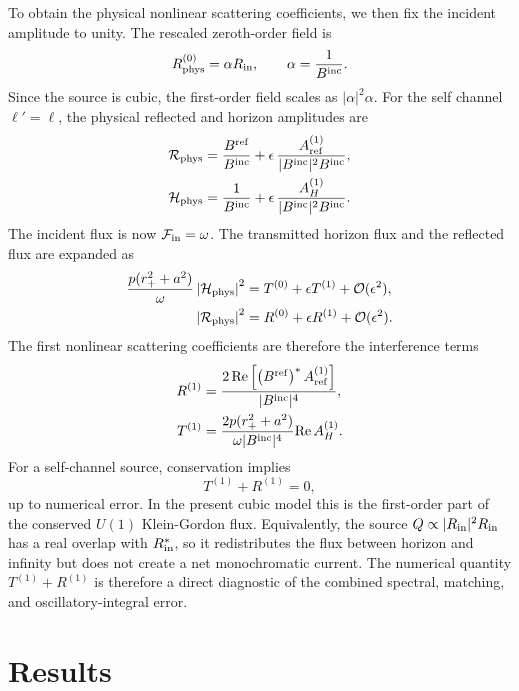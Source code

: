 \documentclass[aps,prd,twocolumn,nofootinbib,superscriptaddress,10pt,floatfix]{revtex4-2}
\newcommand{\calO}{\mathcal{O}}
\newcommand{\rp}{r_+}
\newcommand{\Bin}{B^{\rm inc}}
\newcommand{\Bref}{B^{\rm ref}}
\newcommand{\Aref}{A_{\rm ref}^{(1)}}
\newcommand{\AH}{A_H^{(1)}}
\begin{document}
To obtain the physical nonlinear scattering coefficients, we then fix the
incident amplitude to unity.  The rescaled zeroth-order field is
\begin{equation}
R_{\rm phys}^{(0)}=\alpha R_{\rm in},\qquad \alpha=\frac{1}{\Bin}.
\end{equation}
Since the source is cubic, the first-order field scales as
$|\alpha|^2\alpha$.  For the self channel $\ell'=\ell$, the physical reflected
and horizon amplitudes are
\begin{align}
\mathcal{R}_{\rm phys}
&=
\frac{\Bref}{\Bin}
+
\epsilon\,\frac{\Aref}{|\Bin|^2\Bin},
\\
\mathcal{H}_{\rm phys}
&=
\frac{1}{\Bin}
+
\epsilon\,\frac{\AH}{|\Bin|^2\Bin}.
\end{align}
The incident flux is now $\mathcal{F}_{\rm in}=\omega$.  The transmitted
horizon flux and the reflected flux are expanded as
\begin{align}
\frac{p(\rp^2+a^2)}{\omega}
\left|\mathcal{H}_{\rm phys}\right|^2
&=
T^{(0)}+\epsilon T^{(1)}+\calO(\epsilon^2),
\nonumber\\
\left|\mathcal{R}_{\rm phys}\right|^2
&=
R^{(0)}+\epsilon R^{(1)}+\calO(\epsilon^2).
\end{align}
The first nonlinear scattering coefficients are therefore the interference
terms
\begin{align}
R^{(1)}
&=
\frac{2\,\mathrm{Re}\left[\left(\Bref\right)^*\Aref\right]}
{|\Bin|^4},
\label{eq:R1}\\
T^{(1)}
&=
\frac{2p(\rp^2+a^2)}{\omega|\Bin|^4}
\mathrm{Re}\,\AH .
\label{eq:T1}
\end{align}
For a self-channel source, conservation implies
\begin{equation}
T^{(1)}+R^{(1)}=0,
\label{eq:nonlinearbalance}
\end{equation}
up to numerical error.  In the present cubic model this is the first-order part
of the conserved $U(1)$ Klein-Gordon flux.  Equivalently, the source
$Q\propto |R_{\rm in}|^2R_{\rm in}$ has a real overlap with $R_{\rm in}^*$, so
it redistributes the flux between horizon and infinity but does not create a net
monochromatic current.  The numerical quantity $T^{(1)}+R^{(1)}$ is therefore a
direct diagnostic of the combined spectral, matching, and oscillatory-integral
error.

\section{Results}
\label{sec:results}
\end{document}
